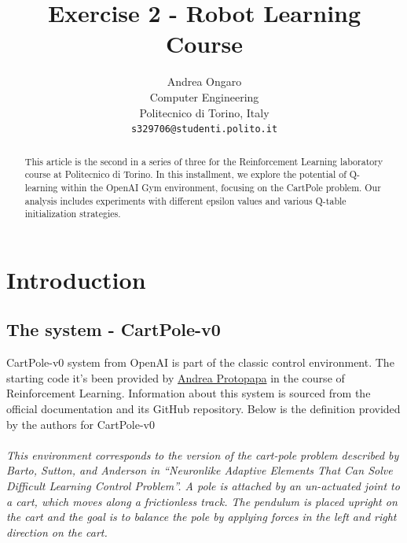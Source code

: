\documentclass{article}
\title{Exercise 2 - Robot Learning Course}
\author{
  Andrea Ongaro\\
	Computer Engineering\\
	Politecnico di Torino, Italy\\
	\texttt{s329706@studenti.polito.it} \\
}
\begin{document}
\maketitle


\begin{abstract}
This article is the second in a series of three for the Reinforcement Learning laboratory course at Politecnico di Torino. In this installment, we explore the potential of Q-learning within the OpenAI Gym environment, focusing on the CartPole problem. Our analysis includes experiments with different epsilon values and various Q-table initialization strategies. 

\end{abstract}



\section{Introduction}
\subsection{The system - CartPole-v0}
CartPole-v0 system from OpenAI is part of the classic control environment. The starting code it's been provided by \href{https://www.polito.it/personale?p=andrea.protopapa}{Andrea Protopapa} in the course of Reinforcement Learning. Information about this system is sourced from the official documentation \cite{Cart_pole} and its GitHub repository. Below is the definition provided by the authors for CartPole-v0\\ \\
\textit{This environment corresponds to the version of the cart-pole problem described by Barto, Sutton, and Anderson in “Neuronlike Adaptive Elements That Can Solve Difficult Learning Control Problem”. A pole is attached by an un-actuated joint to a cart, which moves along a frictionless track. The pendulum is placed upright on the cart and the goal is to balance the pole by applying forces in the left and right direction on the cart.\citep{Cart_pole}}
\end{document}
